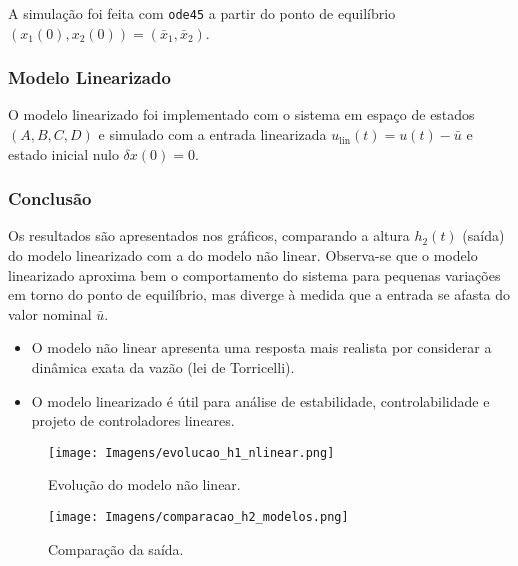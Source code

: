\documentclass[12pt,a4]{article}
\begin{document}
A simulação foi feita com \texttt{ode45} a partir do ponto de equilíbrio $(x_1(0), x_2(0)) = (\bar{x}_1, \bar{x}_2)$.

\subsubsection*{Modelo Linearizado}

O modelo linearizado foi implementado com o sistema em espaço de estados $(A, B, C, D)$ e simulado com a entrada linearizada $u_{\text{lin}}(t) = u(t) - \bar{u}$ e estado inicial nulo $\delta x(0) = 0$.

\subsubsection*{Conclusão}

Os resultados são apresentados nos gráficos, comparando a altura $h_2(t)$ (saída) do modelo linearizado com a do modelo não linear. Observa-se que o modelo linearizado aproxima bem o comportamento do sistema para pequenas variações em torno do ponto de equilíbrio, mas diverge à medida que a entrada se afasta do valor nominal $\bar{u}$.

\begin{itemize}
    \item O modelo não linear apresenta uma resposta mais realista por considerar a dinâmica exata da vazão (lei de Torricelli).
    \item O modelo linearizado é útil para análise de estabilidade, controlabilidade e projeto de controladores lineares.
\end{itemize}

\begin{figure}[!hbt]
    \centering
    \texttt{[image: Imagens/evolucao\_h1\_nlinear.png]}
    \caption{Evolução do modelo não linear.}
    \label{fig:enter-label}
\end{figure}

\begin{figure}[!hbt]
    \centering
    \texttt{[image: Imagens/comparacao\_h2\_modelos.png]}
    \caption{Comparação da saída.}
    \label{fig:enter-label}
\end{figure}

\newpage
\end{document}
